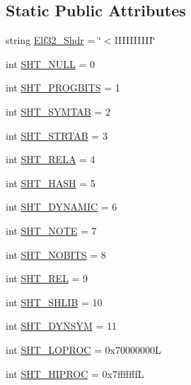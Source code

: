 \subsection*{Static Public Attributes}
\begin{DoxyCompactItemize}
\item 
string \hyperlink{clasself_1_1_e_l_f_section_a3a35798c5d458c3aca833e43e6697cf2}{Elf32\+\_\+\+Shdr} = \char`\"{}$<$I\+I\+I\+I\+I\+I\+I\+I\+II\char`\"{}
\item 
int \hyperlink{clasself_1_1_e_l_f_section_a04e83658757d1fe3d5cb603b4abb9b4f}{S\+H\+T\+\_\+\+N\+U\+LL} = 0
\item 
int \hyperlink{clasself_1_1_e_l_f_section_a8bc8b2f23a47e4b9c3159e5e278017c8}{S\+H\+T\+\_\+\+P\+R\+O\+G\+B\+I\+TS} = 1
\item 
int \hyperlink{clasself_1_1_e_l_f_section_a70f48a0242a169c9450ecea6c543620e}{S\+H\+T\+\_\+\+S\+Y\+M\+T\+AB} = 2
\item 
int \hyperlink{clasself_1_1_e_l_f_section_a5db587e78334ddf189c910f5f3dea9e3}{S\+H\+T\+\_\+\+S\+T\+R\+T\+AB} = 3
\item 
int \hyperlink{clasself_1_1_e_l_f_section_a344f870ef51b681d38762468efde63af}{S\+H\+T\+\_\+\+R\+E\+LA} = 4
\item 
int \hyperlink{clasself_1_1_e_l_f_section_a0c933de0c931080b0998c07c2814c888}{S\+H\+T\+\_\+\+H\+A\+SH} = 5
\item 
int \hyperlink{clasself_1_1_e_l_f_section_a365f52ae9bc967e7c133c275e3833420}{S\+H\+T\+\_\+\+D\+Y\+N\+A\+M\+IC} = 6
\item 
int \hyperlink{clasself_1_1_e_l_f_section_a90c9f3ecaded9ace7be67dc03d1941f8}{S\+H\+T\+\_\+\+N\+O\+TE} = 7
\item 
int \hyperlink{clasself_1_1_e_l_f_section_a2e004a818a3893521b16d6cb97f31a30}{S\+H\+T\+\_\+\+N\+O\+B\+I\+TS} = 8
\item 
int \hyperlink{clasself_1_1_e_l_f_section_ab6d3168d4ea41598cca63f9cf600aa80}{S\+H\+T\+\_\+\+R\+EL} = 9
\item 
int \hyperlink{clasself_1_1_e_l_f_section_a40a76356ebec62b556c12d975fb0f1ee}{S\+H\+T\+\_\+\+S\+H\+L\+IB} = 10
\item 
int \hyperlink{clasself_1_1_e_l_f_section_ac369abab49e0ddc973c6fc303f748c9f}{S\+H\+T\+\_\+\+D\+Y\+N\+S\+YM} = 11
\item 
int \hyperlink{clasself_1_1_e_l_f_section_a1a4d4e72afdccb156e6e5333bb4c7922}{S\+H\+T\+\_\+\+L\+O\+P\+R\+OC} = 0x70000000L
\item 
int \hyperlink{clasself_1_1_e_l_f_section_a63f758ebb9ada842c2ae9dca2de6ca51}{S\+H\+T\+\_\+\+H\+I\+P\+R\+OC} = 0x7fffffffL

\end{DoxyCompactItemize}
